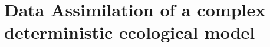 

\chapter{Data Assimilation of a complex deterministic ecological model}
\label{chapter4}

\section{}
